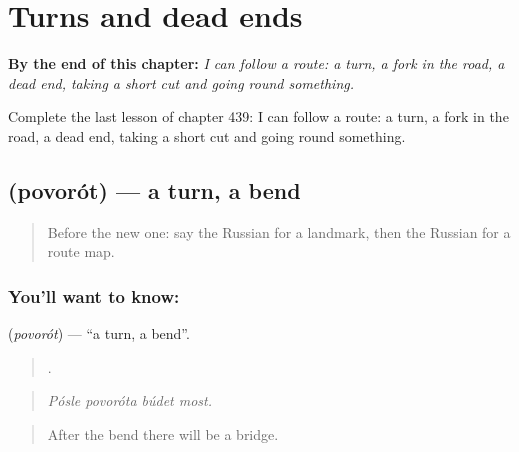 
\chapter{Turns and dead ends}
\label{ch:ru-turns-and-dead-ends}

\begin{chapteropening}
\textbf{By the end of this chapter:} \emph{I can follow a route: a turn, a fork in the road, a dead end, taking a short cut and going round something.}

Complete the last lesson of chapter 439: I can follow a route: a turn, a fork in the road, a dead end, taking a short cut and going round something.
\end{chapteropening}

\section[\texorpdfstring{\ru{поворот} (povorót)}{поворот (povorót)}]{ (povorót) — a turn, a bend}

\label{lesson:RU-C439-povorot}



\begin{quote}
Before the new one: say the Russian for a landmark, then the Russian for a route map.
\end{quote}

\subsection*{You'll want to know: }
\textbf{} (\emph{povorót}) — \textquotedblleft{}a turn, a bend\textquotedblright{}.

\begin{quote}
   .
\end{quote}

\begin{quote}
\emph{Pósle povoróta búdet most.}
\end{quote}

\begin{quote}
After the bend there will be a bridge.
\end{quote}

